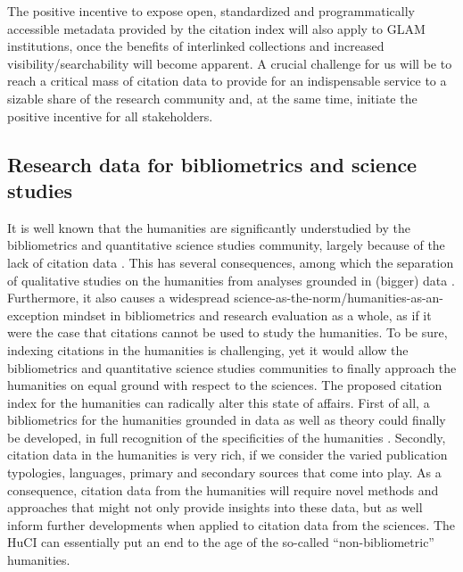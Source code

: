The positive incentive to expose open, standardized and programmatically accessible metadata provided by the citation index will also apply to GLAM institutions, once the benefits of interlinked collections and increased visibility/searchability will become apparent. A crucial challenge for us will be to reach a critical mass of citation data to provide for an indispensable service to a sizable share of the research community and, at the same time, initiate the positive incentive for all stakeholders.

\subsection{Research data for bibliometrics and science studies}
 
It is well known that the humanities are significantly understudied by the bibliometrics and quantitative science studies community, largely because of the lack of citation data \cite{colavizza_citation_2019}. This has several consequences, among which the separation of qualitative studies on the humanities from analyses grounded in (bigger) data \cite{franssen_science_2019}. Furthermore, it also causes a widespread science-as-the-norm/humanities-as-an-exception mindset in bibliometrics and research evaluation as a whole, as if it were the case that citations cannot be used to study the humanities. To be sure, indexing citations in the humanities is challenging, yet it would allow the bibliometrics and quantitative science studies communities to finally approach the humanities on equal ground with respect to the sciences.
The proposed citation index for the humanities can radically alter this state of affairs. First of all, a bibliometrics for the humanities grounded in data as well as theory could finally be developed, in full recognition of the specificities of the humanities \cite{hammarfelt_beyond_2016}. Secondly, citation data in the humanities is very rich, if we consider the varied publication typologies, languages, primary and secondary sources that come into play. As a consequence, citation data from the humanities will require novel methods and approaches that might not only provide insights into these data, but as well inform further developments when applied to citation data from the sciences. The HuCI can essentially put an end to the age of the so-called ``non-bibliometric'' humanities.

